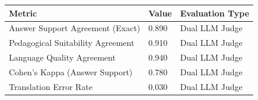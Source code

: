 \begin{tabular}{lll}
\toprule
Metric & Value & Evaluation Type \\
\midrule
Answer Support Agreement (Exact) & 0.890 & Dual LLM Judge \\
Pedagogical Suitability Agreement & 0.910 & Dual LLM Judge \\
Language Quality Agreement & 0.940 & Dual LLM Judge \\
Cohen's Kappa (Answer Support) & 0.780 & Dual LLM Judge \\
Translation Error Rate & 0.030 & Dual LLM Judge \\
\bottomrule
\end{tabular}
